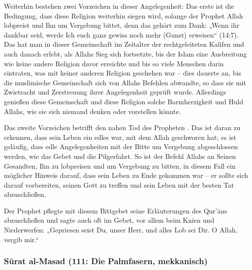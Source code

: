 Weiterhin bestehen zwei Vorzeichen in dieser Angelegenheit: Das erste ist die Bedingung, dass
diese Religion weiterhin siegen wird, solange der Prophet Allah lobpreist und Ihn um Vergebung
bittet, denn das gehört zum Dank: „Wenn ihr dankbar seid, werde Ich euch ganz gewiss noch
mehr (Gunst) erweisen“ (14:7). Das hat man in dieser Gemeinschaft im Zeitalter der
rechtgeleiteten Kalifen und auch danach erlebt, als Allahs Sieg sich fortsetzte, bis der Islam eine
Ausbreitung wie keine andere Religion davor erreichte und bis so viele Menschen darin eintraten,
was mit keiner anderen Religion geschehen war – dies dauerte an, bis die muslimische
Gemeinschaft sich von Allahs Befehlen abwandte, so dass sie mit Zwietracht und Zerstreuung
ihrer Angelegenheit geprüft wurde. Allerdings genießen diese Gemeinschaft und diese Religion
solche Barmherzigkeit und Huld Allahs, wie sie sich niemand denken oder vorstellen könnte.

Das zweite Vorzeichen betrifft den nahen Tod des Propheten . Das ist daran zu erkennen,
dass sein Leben ein edles war, mit dem Allah geschworen hat; es ist geläufig, dass edle
Angelegenheiten mit der Bitte um Vergebung abgeschlossen werden, wie das Gebet und die
Pilgerfahrt. So ist der Befehl Allahs an Seinen Gesandten, Ihn zu lobpreisen und um Vergebung zu
bitten, in diesem Fall ein möglicher Hinweis darauf, dass sein Leben zu Ende gekommen war – er
sollte sich darauf vorbereiten, seinen Gott zu treffen und sein Leben mit der besten Tat
abzuschließen.

\begin{merke}
Der Prophet  pflegte mit diesem Bittgebet seine Erläuterungen des Qur’āns abzuschließen
und sagte auch oft im Gebet, vor allem beim Knien und Niederwerfen: „Gepriesen seist Du,
unser Herr, und alles Lob sei Dir. O Allah, vergib mir.“
\end{merke}

\subsubsection*{Sūrat al-Masad (111: Die Palmfasern, mekkanisch)}

